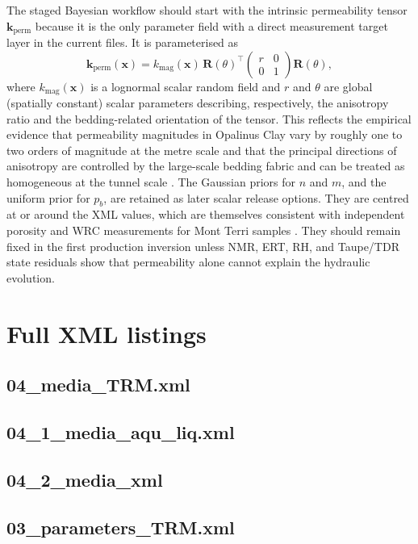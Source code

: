 \documentclass[10pt,a4paper]{article}
\begin{document}
The staged Bayesian workflow should start with the intrinsic permeability tensor
\(\bm{k}_{\mathrm{perm}}\) because it is the only parameter field with a direct
measurement target layer in the current files.  It is parameterised as
\[
\bm{k}_{\mathrm{perm}}(\bm x)
= k_{\mathrm{mag}}(\bm x)\,
\mathbf{R}(\theta)^\top
\begin{pmatrix}
r & 0\\[0.3em]
0 & 1
\end{pmatrix}
\mathbf{R}(\theta),
\]
where \(k_{\mathrm{mag}}(\bm x)\) is a lognormal scalar random field and
\(r\) and \(\theta\) are global (spatially constant) scalar parameters describing,
respectively, the anisotropy ratio and the bedding-related orientation of the tensor.
This reflects the empirical evidence that permeability magnitudes in Opalinus Clay
vary by roughly one to two orders of magnitude at the metre scale and that the
principal directions of anisotropy are controlled by the large-scale bedding fabric
and can be treated as homogeneous at the tunnel scale
\cite[pp.~130--135]{Marschall2005}
\cite[pp.~2--5]{Garitte2017}
\cite[pp.~225--227]{ComparativeHydraulicOPA2017}
\cite[pp.~4447--4450]{WaterContentEDZ2024}.
The Gaussian priors for \(n\) and \(m\), and the uniform prior for \(p_b\), are retained
as later scalar release options.  They are centred at or around the XML values, which
are themselves consistent with independent porosity and WRC measurements for Mont
Terri samples
\cite[pp.~44 and 65--66, Tables~12 and 19]{VanLoon2004Nagra}
\cite[pp.~22--33, Sects.~4--5]{VillarRomero2012}.  They should remain fixed in the
first production inversion unless NMR, ERT, RH, and Taupe/TDR state residuals show that
permeability alone cannot explain the hydraulic evolution.




\section{Full XML listings}

\subsection*{04\_media\_TRM.xml}


\subsection*{04\_1\_media\_aqu\_liq.xml}


\subsection*{04\_2\_media\_xml}


\subsection*{03\_parameters\_TRM.xml}




\end{document}

